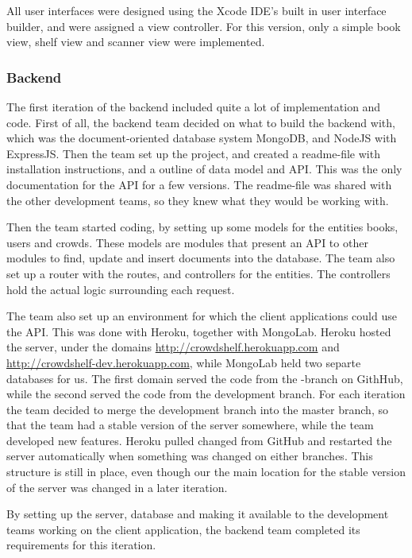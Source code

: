 All user interfaces were designed using the Xcode \gls{IDE}'s built in user interface builder, and were assigned a view controller. For this version, only a simple book view, shelf view and scanner view were implemented.


\subsubsection{Backend}
The first iteration of the \gls{backend} included quite a lot of implementation and code. First of all, the backend team decided on what to build the \gls{backend} with, which was the document-oriented database system MongoDB, and NodeJS with ExpressJS. \cite{mongodb}\cite{node-about}\cite{express} Then the team set up the project, and created a readme-file with installation instructions, and a outline of data model and \gls{API}. This was the only documentation for the \gls{API} for a few versions. The readme-file was shared with  the other development teams, so they knew what they would be working with.

Then the team started coding, by setting up some models for the entities books, users and crowds. These models are modules that present an \gls{API} to other modules to find, update and insert documents into the database. The team also set up a router with the routes, and controllers for the entities. The controllers hold the actual logic surrounding each request. 

The team also set up an environment for which the client applications could use the \gls{API}. This was done with Heroku, together with MongoLab.\cite{heroku}\cite{mongolab} Heroku hosted the server, under the domains \url{http://crowdshelf.herokuapp.com} and \url{http://crowdshelf-dev.herokuapp.com}, while MongoLab held two separte databases for us. The first domain served the code from the -\gls{branch} on GithHub, while the second served the code from the development \gls{branch}. For each iteration the team decided to merge the development \gls{branch} into the master \gls{branch}, so that the team had a stable version of the server somewhere, while the team developed new features. Heroku pulled changed from GitHub and restarted the server automatically when something was changed on either branches. This structure is still in place, even though our the main location for the stable version of the server was changed in a later iteration. 

By setting up the server, database and making it available to the development teams working on the client application, the backend team completed its requirements for this iteration.

